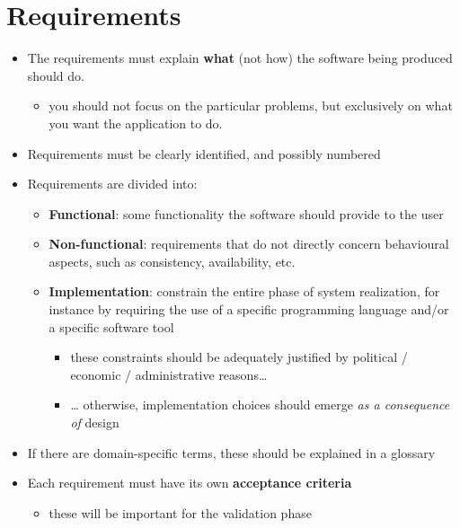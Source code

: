 \documentclass{scrartcl}
\begin{document}
\section{Requirements}\label{requirements}

\begin{itemize}
  \item The requirements must explain \textbf{what} (not how) the software
  being produced should do.

  \begin{itemize}
    \item you should not focus on the particular problems, but exclusively on
    what you want the application to do.
  \end{itemize}
  \item Requirements must be clearly identified, and possibly numbered
  \item Requirements are divided into:

  \begin{itemize}
    \item \textbf{Functional}: some functionality the software should provide
    to the user
    \item \textbf{Non-functional}: requirements that do not directly concern
    behavioural aspects, such as consistency, availability, etc.
    \item \textbf{Implementation}: constrain the entire phase of system
    realization, for instance by requiring the use of a specific
    programming language and/or a specific software tool

    \begin{itemize}
      \item these constraints should be adequately justified by political /
      economic / administrative reasons\ldots{}
      \item \ldots{} otherwise, implementation choices should emerge \emph{as
      a consequence of} design
    \end{itemize}
  \end{itemize}
  \item If there are domain-specific terms, these should be explained in a
  glossary
  \item Each requirement must have its own \textbf{acceptance criteria}

  \begin{itemize}
    \item these will be important for the validation phase
  \end{itemize}
\end{itemize}
\end{document}
